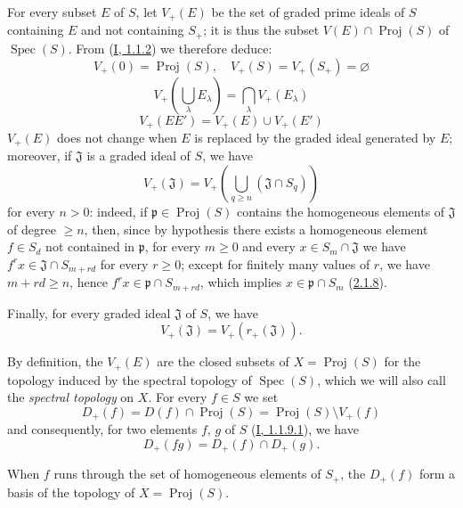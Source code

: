 \begin{env}[2.3.2]
\label{II.2.3.2}
For every subset $E$ of $S$, let $V_+(E)$ be the set of graded prime
ideals of $S$ containing $E$ and not containing $S_+$; it is thus the
subset $V(E)\cap\operatorname{Proj}(S)$ of
$\operatorname{Spec}(S)$. From (\hyperref[I.1.1.2]{I, 1.1.2}) we
therefore deduce:
\[
  \label{II.2.3.2.1}
  V_+(0)=\operatorname{Proj}(S),\quad
  V_+(S)=V_+(S_+)=\varnothing
  \tag{2.3.2.1}
\]
\[
  \label{II.2.3.2.2}
  V_+\left(\bigcup_\lambda E_\lambda\right)
  =\bigcap_\lambda V_+(E_\lambda)
  \tag{2.3.2.2}
\]
\[
  \label{II.2.3.2.3}
  V_+(EE')=V_+(E)\cup V_+(E')
  \tag{2.3.2.3}
\]
$V_+(E)$ does not change when $E$ is replaced by the graded ideal generated
by $E$; moreover, if $\mathfrak{J}$ is a graded ideal of $S$, we have
\[
  \label{II.2.3.2.4}
  V_+(\mathfrak{J})
  =V_+\left(\bigcup_{q\geq n}(\mathfrak{J}\cap S_q)\right)
  \tag{2.3.2.4}
\]
for every $n>0$: indeed, if
$\mathfrak{p}\in\operatorname{Proj}(S)$ contains the homogeneous elements of
$\mathfrak{J}$ of degree $\geq n$, then, since by hypothesis there exists a
homogeneous element $f\in S_d$ not contained in $\mathfrak{p}$, for every
$m\geq 0$ and every $x\in S_m\cap\mathfrak{J}$ we have
$f^r x\in\mathfrak{J}\cap S_{m+rd}$ for every $r\geq0$; except for
finitely many values of $r$, we have $m+rd\geq n$, hence
$f^r x\in\mathfrak{p}\cap S_{m+rd}$, which implies
$x\in\mathfrak{p}\cap S_m$
(\hyperref[II.2.1.8]{2.1.8}).

Finally, for every graded ideal $\mathfrak{J}$ of $S$, we have
\[
  \label{II.2.3.2.5}
  V_+(\mathfrak{J})=V_+(r_+(\mathfrak{J})).
  \tag{2.3.2.5}
\]
\end{env}

\begin{env}[2.3.3]
\label{II.2.3.3}
By definition, the $V_+(E)$ are the closed subsets of
$X=\operatorname{Proj}(S)$ for the topology induced by the spectral
topology of $\operatorname{Spec}(S)$, which we will also call the
\emph{spectral topology} on $X$. For every $f\in S$ we set
\[
  \label{II.2.3.3.1}
  D_+(f)=D(f)\cap\operatorname{Proj}(S)
  =\operatorname{Proj}(S)\setminus V_+(f)
  \tag{2.3.3.1}
\]
and consequently, for two elements $f$, $g$ of $S$
(\hyperref[I.1.1.9.1]{I, 1.1.9.1}), we have
\[
  \label{II.2.3.3.2}
  D_+(fg)=D_+(f)\cap D_+(g).
  \tag{2.3.3.2}
\]
\end{env}

\begin{proposition}[2.3.4]
\label{II.2.3.4}
When $f$ runs through the set of homogeneous elements of $S_+$, the
$D_+(f)$ form a basis of the topology of
$X=\operatorname{Proj}(S)$.
\end{proposition}

